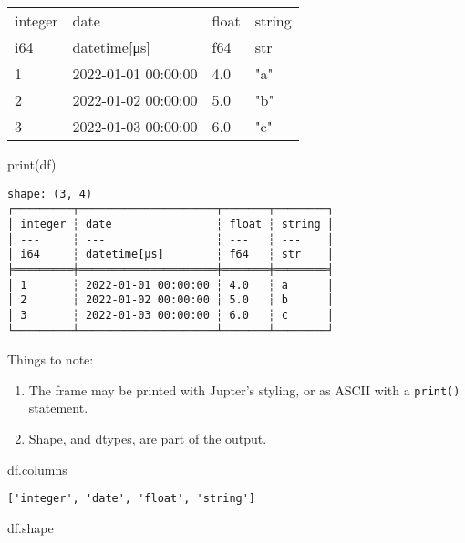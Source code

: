 \documentclass[
  letterpaper,
  DIV=11,
  numbers=noendperiod]{scrartcl}
\newenvironment{Shaded}{\begin{snugshade}}{\end{snugshade}}
\newcommand{\BuiltInTok}[1]{\textcolor[rgb]{0.00,0.23,0.31}{#1}}
\newcommand{\NormalTok}[1]{\textcolor[rgb]{0.00,0.23,0.31}{#1}}
\providecommand{\tightlist}{%
  \setlength{\itemsep}{0pt}\setlength{\parskip}{0pt}}\usepackage{longtable,booktabs,array}
\begin{document}
\begin{longtable}[]{@{}llll@{}}
\toprule()
integer & date & float & string \\
i64 & datetime{[}μs{]} & f64 & str \\
\midrule()
\endhead
1 & 2022-01-01 00:00:00 & 4.0 & "a" \\
2 & 2022-01-02 00:00:00 & 5.0 & "b" \\
3 & 2022-01-03 00:00:00 & 6.0 & "c" \\
\bottomrule()
\end{longtable}

\begin{Shaded}
\begin{Highlighting}[]
\BuiltInTok{print}\NormalTok{(df)}
\end{Highlighting}
\end{Shaded}

\begin{verbatim}
shape: (3, 4)
┌─────────┬─────────────────────┬───────┬────────┐
│ integer ┆ date                ┆ float ┆ string │
│ ---     ┆ ---                 ┆ ---   ┆ ---    │
│ i64     ┆ datetime[μs]        ┆ f64   ┆ str    │
╞═════════╪═════════════════════╪═══════╪════════╡
│ 1       ┆ 2022-01-01 00:00:00 ┆ 4.0   ┆ a      │
│ 2       ┆ 2022-01-02 00:00:00 ┆ 5.0   ┆ b      │
│ 3       ┆ 2022-01-03 00:00:00 ┆ 6.0   ┆ c      │
└─────────┴─────────────────────┴───────┴────────┘
\end{verbatim}

Things to note:

\begin{enumerate}
\def\labelenumi{\arabic{enumi}.}
\tightlist
\item
  The frame may be printed with Jupter's styling, or as ASCII with a
  \texttt{print()} statement.
\item
  Shape, and dtypes, are part of the output.
\end{enumerate}

\begin{Shaded}
\begin{Highlighting}[]
\NormalTok{df.columns}
\end{Highlighting}
\end{Shaded}

\begin{verbatim}
['integer', 'date', 'float', 'string']
\end{verbatim}

\begin{Shaded}
\begin{Highlighting}[]
\NormalTok{df.shape}
\end{Highlighting}
\end{Shaded}
\end{document}
